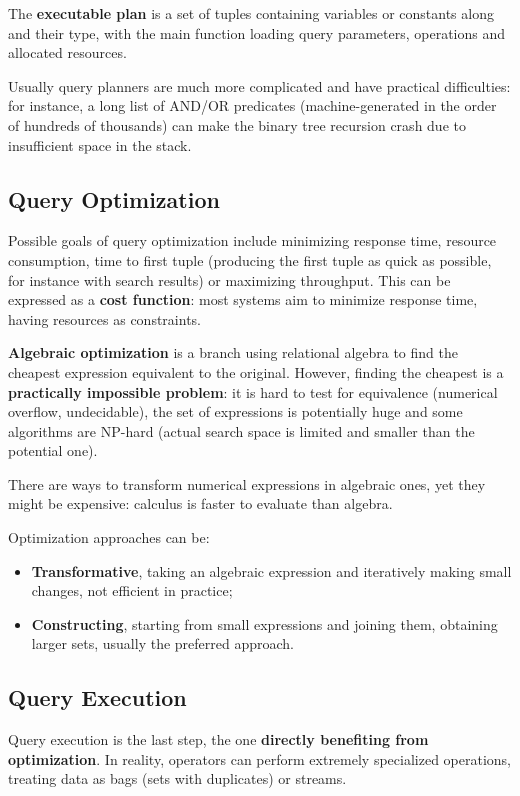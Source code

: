 The \textbf{executable plan} is a set of tuples containing variables or constants along and their type, with the main function loading query parameters, operations and allocated resources. 

Usually query planners are much more complicated and have practical difficulties: for instance, a long list of AND/OR predicates (machine-generated in the order of hundreds of thousands) can make the binary tree recursion crash due to insufficient space in the stack.

\subsection{Query Optimization}
Possible goals of query optimization include minimizing response time, resource consumption, time to first tuple (producing the first tuple as quick as possible, for instance with search results) or maximizing throughput. This can be expressed as a \textbf{cost function}: most systems aim to minimize response time, having resources as constraints.

\textbf{Algebraic optimization} is a branch using relational algebra to find the cheapest expression equivalent to the original. However, finding the cheapest is a \textbf{practically impossible problem}: it is hard to test for equivalence (numerical overflow, undecidable), the set of expressions is potentially huge and some algorithms are NP-hard (actual search space is limited and smaller than the potential one). 

There are ways to transform numerical expressions in algebraic ones, yet they might be expensive: calculus is faster to evaluate than algebra. 

Optimization approaches can be:
\begin{itemize}
	\item \textbf{Transformative}, taking an algebraic expression and iteratively making small changes, not efficient in practice;
	\item \textbf{Constructing}, starting from small expressions and joining them, obtaining larger sets, usually the preferred approach.
\end{itemize}

\subsection{Query Execution}
Query execution is the last step, the one \textbf{directly benefiting from optimization}. In reality, operators can perform extremely specialized operations, treating data as bags (sets with duplicates) or streams.

